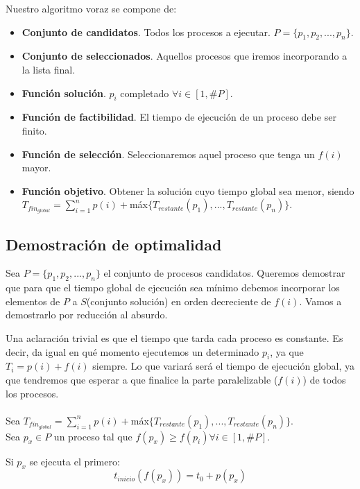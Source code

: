 \documentclass[12pt,spanish]{article}
\begin{document}
Nuestro algoritmo voraz se compone de:
\begin{itemize}
	\item \textbf{Conjunto de candidatos}. Todos los procesos a ejecutar. $P=\{p_1, p_2, ..., p_n\}$.
	\item \textbf{Conjunto de seleccionados}. Aquellos procesos que iremos incorporando a la lista final.
	\item \textbf{Función solución}. $p_i$ completado $\forall i \in [1,\#P]$.
	\item \textbf{Función de factibilidad}. El tiempo de ejecución de un proceso debe ser finito.
	\item \textbf{Función de selección}. Seleccionaremos aquel proceso que tenga un $f(i)$ mayor.
	\item \textbf{Función objetivo}. Obtener la solución cuyo tiempo global sea menor, siendo $T_{fin_{global}} = \sum_{i=1}^{n} p(i) + $máx$\{T_{restante}(p_1),...,T_{restante}(p_n)\}$.
\end{itemize}

\subsection{Demostración de optimalidad}

Sea $P=\{p_1,p_2,...,p_n\}$ el conjunto de procesos candidatos. Queremos demostrar que para que el tiempo global de ejecución sea mínimo debemos incorporar los elementos de $P$ a $S$(conjunto solución) en orden decreciente de $f(i)$. Vamos a demostrarlo por reducción al absurdo.

Una aclaración trivial es que el tiempo que tarda cada proceso es constante. Es decir, da igual en qué momento ejecutemos un determinado $p_i$, ya que $T_i=p(i)+f(i)$ siempre. Lo que variará será el tiempo de ejecución global, ya que tendremos que esperar a que finalice la parte paralelizable ($f(i)$) de todos los procesos.\\\\

Sea $T_{fin_{global}} = \sum_{i=1}^{n} p(i) + $máx$\{T_{restante}(p_1),...,T_{restante}(p_n)\}$.\\

Sea $p_x \in P$ un proceso tal que $f(p_x)\geq f(p_i) \forall i \in [1,\#P]$.

Si $p_x$ se ejecuta el primero:\\
\begin{equation*}
	t_{inicio}(f(p_x))= t_0 + p(p_x)
\end{equation*}
\end{document}
